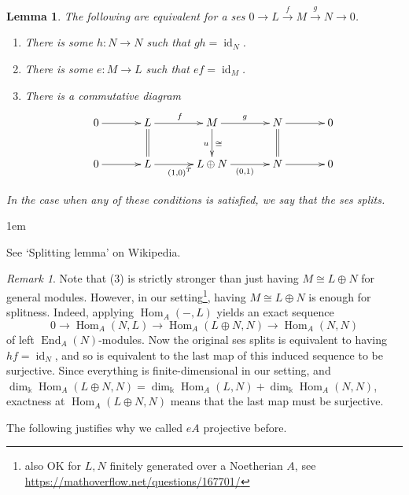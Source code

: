\documentclass[11pt,a4paper]{article}
\makeatletter
\numberwithin{equation}{section}
\renewenvironment{proof}[1][\proofname]{\par
    \pushQED{\qed}%
    \normalfont \topsep0\p@\@plus6\p@ \labelsep1em\relax
    \trivlist
    \item[\hskip\labelsep\indent
        \bfseries #1]\ignorespaces
    \mbox{}
}{
    \popQED\endtrivlist\@endpefalse
}
\theoremstyle{all}
\newtheorem{lemma}[theorem]{Lemma}
\theoremstyle{remark}
\newtheorem{remark}[theorem]{Remark}
\newcommand{\id}{\operatorname{id}}
\newcommand{\Hom}{\operatorname{Hom}\nolimits}
\newcommand{\End}{\operatorname{End}\nolimits}
\newcommand{\defn}[1]{\textsl{\color{darkblue} #1}}
\makeatother
\begin{document}
\begin{lemma}\label{lem:split ses}
The following are equivalent for a ses $0\to L\xrightarrow{f} M \xrightarrow{g} N \to 0$.
\begin{enumerate}
\item There is some $h:N\to N$ such that $gh=\id_N$.
\item There is some $e:M\to L$ such that $ef=\id_M$.
\item There is a commutative diagram
\[
\xymatrix@C=35pt{
0\ar[r] & L \ar[r]^{f}\ar@{=}[d] & M\ar[r]^{g}\ar[d]^{\cong}_{u}& N\ar[r]\ar@{=}[d]&0 \\
0\ar[r] & L \ar[r]_{(1,0)^T} & L\oplus N\ar[r]_{(0,1)}& N\ar[r]&0 \\
}
\]
\end{enumerate}
In the case when any of these conditions is satisfied, we say that the ses \defn{splits}.
\end{lemma}
\begin{proof}
See `Splitting lemma' on Wikipedia.
\end{proof}
\begin{remark}
Note that (3) is strictly stronger than just having $M\cong L\oplus N$ for general modules.  However, in our setting\footnote{also OK for $L,N$ finitely generated over a Noetherian $A$, see \url{https://mathoverflow.net/questions/167701/}}, having $M\cong L\oplus N$ is enough for splitness.  Indeed, applying $\Hom_A(-,L)$ yields an exact sequence 
\[
0\to \Hom_A(N,L)\to\Hom_A(L\oplus N, N)\to \Hom_A(N,N)
\]
of left $\End_A(N)$-modules.
Now the original ses splits is equivalent to having $hf=\id_N$, and so is equivalent to the last map of this induced sequence to be surjective.
Since everything is finite-dimensional in our setting, and $\dim_\Bbbk\Hom_A(L\oplus N,N)=\dim_\Bbbk\Hom_A(L,N)+\dim_\Bbbk\Hom_A(N,N)$, exactness at $\Hom_A(L\oplus N,N)$ means that the last map must be surjective.
\end{remark}

The following justifies why we called $eA$ projective before.
\end{document}
